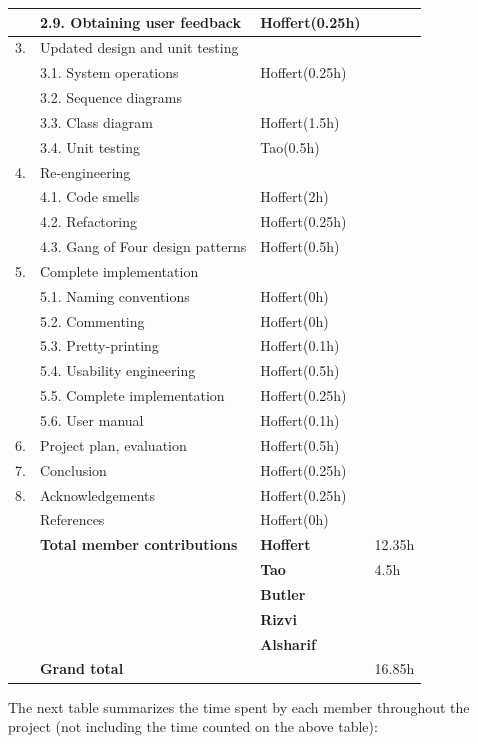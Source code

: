 \documentclass[12pt,a4paper]{article}
\begin{document}
\begin{longtable}{| p{0.2cm} p{6.25cm} | p{3cm}| p{5cm} |}
   & 2.9. Obtaining user feedback & Hoffert(0.25h) &  \\ \hline
  3. & Updated design and unit testing &  &  \\ \hline
   & 3.1. System operations & Hoffert(0.25h) &  \\ \hline
   & 3.2. Sequence diagrams &  &  \\ \hline
   & 3.3. Class diagram & Hoffert(1.5h) &  \\ \hline
   & 3.4. Unit testing & Tao(0.5h) &  \\ \hline
  4. & Re-engineering &  &  \\ \hline
   & 4.1. Code smells & Hoffert(2h) &  \\ \hline
   & 4.2. Refactoring & Hoffert(0.25h) &  \\ \hline
   & 4.3. Gang of Four design patterns & Hoffert(0.5h) &  \\ \hline
  5. & Complete implementation &  &  \\ \hline
   & 5.1. Naming conventions & Hoffert(0h) &  \\ \hline
   & 5.2. Commenting & Hoffert(0h) &  \\ \hline
   & 5.3. Pretty-printing & Hoffert(0.1h) &  \\ \hline
   & 5.4. Usability engineering & Hoffert(0.5h) &  \\ \hline
   & 5.5. Complete implementation & Hoffert(0.25h) &  \\ \hline
   & 5.6. User manual & Hoffert(0.1h) &  \\ \hline
  6. & Project plan, evaluation & Hoffert(0.5h) &  \\ \hline
  7. & Conclusion & Hoffert(0.25h) &  \\ \hline
  8. & Acknowledgements & Hoffert(0.25h) &  \\ \hline
   & References & Hoffert(0h) &  \\ \hline
    & \textbf{Total member contributions} & \textbf{Hoffert} & 12.35h \\ \cline{3-4}
    &  & \textbf{Tao} & 4.5h \\ \cline{3-4}
    &  & \textbf{Butler} & \\ \cline{3-4}
    &  & \textbf{Rizvi} & \\ \cline{3-4}
    &  & \textbf{Alsharif} & \\ \hline
    & \textbf{Grand total} &  & 16.85h \\ \hline
\end{longtable}

The next table summarizes the time spent by each member throughout the project (not including the time counted on the above table):
\end{document}
